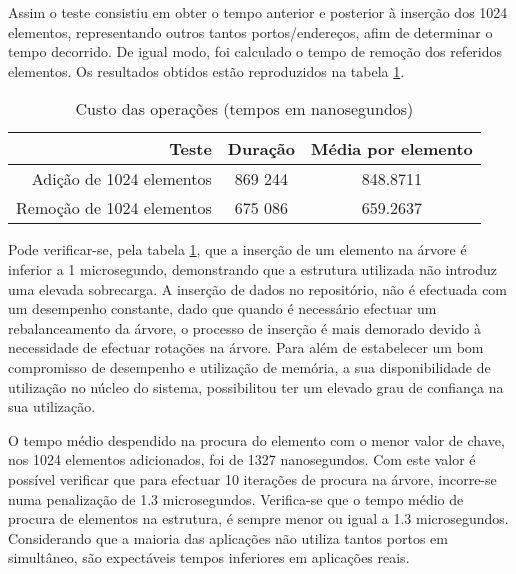 Assim o teste consistiu em obter o tempo anterior e posterior à inserção dos 1024 elementos, representando outros tantos portos/endereços, afim de determinar o tempo decorrido.
De igual modo, foi calculado o tempo de remoção dos referidos elementos.
Os resultados obtidos estão reproduzidos na tabela \ref{tab:tree_info}.
 
\begin{table}[!htb]
\begin{center}
\caption{Custo das operações (tempos em nanosegundos)}
\begin{tabular}{ | r | c | c | }
\hline
\hspace{1cm} Teste \hspace{1.5cm} & \hspace{1cm}Duração\hspace{1cm} &  Média por
elemento \\
\hline
Adição de 1024 elementos & 869 244 & 848.8711 \\
\hline
Remoção de 1024 elementos & 675 086 & 659.2637\\
\hline

\hline
\end{tabular}
\label{tab:tree_info}
\end{center}
\end{table}

Pode verificar-se, pela tabela \ref{tab:tree_info}, que a inserção de um elemento na árvore é inferior a 1 microsegundo, demonstrando que a estrutura utilizada não introduz uma elevada sobrecarga.
A inserção de dados no repositório, não é efectuada com um desempenho constante, dado que quando é necessário efectuar um rebalanceamento da árvore, o processo de inserção é mais demorado devido à necessidade de efectuar rotações na árvore.
Para além de estabelecer um bom compromisso de desempenho e utilização de memória, a sua disponibilidade de utilização no núcleo do sistema, possibilitou ter um elevado grau de confiança na sua utilização.

O tempo médio despendido na procura do elemento com o menor valor de chave, nos 1024 elementos adicionados, foi de 1327 nanosegundos.
Com este valor é possível verificar que para efectuar 10 iterações de procura na árvore, incorre-se numa penalização de 1.3 microsegundos.
Verifica-se que o tempo médio de procura de elementos na estrutura, é sempre menor ou igual a 1.3 microsegundos.
Considerando que a maioria das aplicações não utiliza tantos portos em simultâneo, são expectáveis tempos inferiores em aplicações reais.

